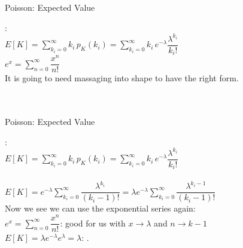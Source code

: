 \documentclass[10pt,sans,english,compress,xcolor=dvipsnames]{beamer}
\begin{document}
\begin{frame}{Poisson: Expected Value}

\small

: \\[1ex]
$E[K]  = \sum\limits_{k_i =0}^{\infty} k_i \,p_K(k_i) = \sum\limits_{k_i =0}^{\infty} k_i\, e^{-\lambda} \dfrac{ \lambda^{k_i}}{k_i!}$\\[1ex]

 $e^x = \sum\limits_{n=0}^{\infty} \dfrac{x^n}{n!}$\\[1ex]

It is going to need massaging into shape to have the right form.\\[1ex]

\\[1ex]
 \\[1ex]

\end{frame} 




\begin{frame}{Poisson: Expected Value}

\small

: \\[1ex]
$E[K]  = \sum\limits_{k_i =0}^{\infty} k_i \,p_K(k_i) = \sum\limits_{k_i =0}^{\infty} k_i\, e^{-\lambda} \dfrac{ \lambda^{k_i}}{k_i!}$\\[1ex]
 \\[1ex]

$E[K]  = e^{-\lambda} \sum\limits_{k_i =0}^{\infty}  \dfrac{ \lambda^{k_i}}{(k_i-1)!} =  \lambda e^{-\lambda} \sum\limits_{k_i =0}^{\infty}  \dfrac{ \lambda^{k_i-1}}{(k_i-1)!} $\\[1ex]



Now we see we can use the exponential series again: \\[1ex]
$e^{x} = \sum\limits_{n=0}^{\infty} \dfrac{x^n}{n!} $: good for us with $x\rightarrow \lambda$ and $n\rightarrow k-1$\\[1ex]

\textbf{$E[K] = \lambda e^{-\lambda}  e^{\lambda} =\lambda $}: .\\[1ex]
\\[1ex]
\end{frame} 
\end{document}
